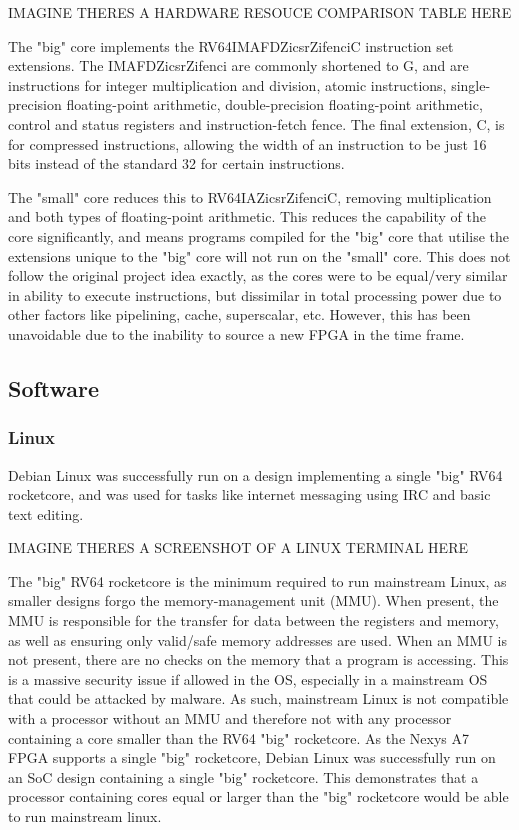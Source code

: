 IMAGINE THERES A HARDWARE RESOUCE COMPARISON TABLE HERE

The "big" core implements the RV64IMAFDZicsrZifenciC instruction set extensions. The IMAFDZicsrZifenci are commonly shortened to G, and are instructions for integer multiplication and division, atomic instructions, single-precision floating-point arithmetic, double-precision floating-point arithmetic, control and status registers and instruction-fetch fence. The final extension, C, is for compressed instructions, allowing the width of an instruction to be just 16 bits instead of the standard 32 for certain instructions. 

The "small" core reduces this to RV64IAZicsrZifenciC, removing multiplication and both types of floating-point arithmetic. This reduces the capability of the core significantly, and means programs compiled for the "big" core that utilise the extensions unique to the "big" core will not run on the "small" core. This does not follow the original project idea exactly, as the cores were to be equal/very similar in ability to execute instructions, but dissimilar in total processing power due to other factors like pipelining, cache, superscalar, etc. However, this has been unavoidable due to the inability to source a new FPGA in the time frame.

\subsection{Software}
\subsubsection{Linux}
Debian Linux was successfully run on a design implementing a single "big" RV64 rocketcore, and was used for tasks like internet messaging using IRC\cite{} and basic text editing.

IMAGINE THERES A SCREENSHOT OF A LINUX TERMINAL HERE

The "big" RV64 rocketcore is the minimum required to run mainstream Linux, as smaller designs forgo the memory-management unit (MMU). When present, the MMU\cite{} is responsible for the transfer for data between the registers and memory, as well as ensuring only valid/safe memory addresses are used. When an MMU is not present, there are no checks on the memory that a program is accessing. This is a massive security issue if allowed in the OS, especially in a mainstream OS that could be attacked by malware. As such, mainstream Linux is not compatible with a processor without an MMU\cite{} and therefore not with any processor containing a core smaller than the RV64 "big" rocketcore. As the Nexys A7 FPGA supports a single "big" rocketcore, Debian Linux\cite{debianriscv} was successfully run on an SoC design containing a single "big" rocketcore. This demonstrates that a processor containing cores equal or larger than the "big" rocketcore would be able to run mainstream linux.


